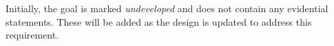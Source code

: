 \noindent
Initially, the goal is marked {\em undeveloped} and does not contain any evidential statements.  
These will be added as the design is updated to address this requirement.  


